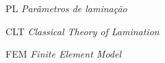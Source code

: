 
\begin{siglas}

  \item[PL] \emph{Parâmetros de laminação}
  \item[CLT] \emph{Classical Theory of Lamination}
  \item[FEM] \emph{Finite Element Model}


\end{siglas}
